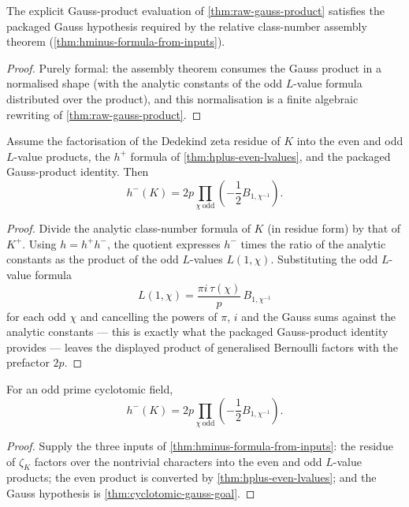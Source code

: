 \begin{theorem}\label{thm:cyclotomic-gauss-goal}
  \leanok
The explicit Gauss-product evaluation of \cref{thm:raw-gauss-product}
satisfies the packaged Gauss hypothesis required by the relative
class-number assembly theorem (\cref{thm:hminus-formula-from-inputs}).
\end{theorem}
\begin{proof}\leanok
Purely formal: the assembly theorem consumes the Gauss product in a
normalised shape (with the analytic constants of the odd $L$-value formula
distributed over the product), and this normalisation is a finite algebraic
rewriting of \cref{thm:raw-gauss-product}.
\end{proof}

\begin{theorem}\label{thm:hminus-formula-from-inputs}
  \leanok
Assume the factorisation of the Dedekind zeta residue of $K$ into the even
and odd $L$-value products, the $h^+$ formula of
\cref{thm:hplus-even-lvalues}, and the packaged Gauss-product identity.
Then
\[
  h^-(K)
  =
  2p\prod_{\chi\ \mathrm{odd}}
    \left(-\frac12 B_{1,\chi^{-1}}\right).
\]
\end{theorem}
\begin{proof}\leanok
Divide the analytic class-number formula of $K$ (in residue form) by that
of $K^+$.  Using $h = h^+ h^-$, the quotient expresses $h^-$ times the
ratio of the analytic constants as the product of the odd $L$-values
$L(1,\chi)$.  Substituting the odd $L$-value formula
\[
  L(1,\chi) = \frac{\pi i\,\tau(\chi)}{p}\,B_{1,\chi^{-1}}
\]
for each odd $\chi$ and cancelling the powers of $\pi$, $i$ and the Gauss
sums against the analytic constants --- this is exactly what the packaged
Gauss-product identity provides --- leaves the displayed product of
generalised Bernoulli factors with the prefactor $2p$.
\end{proof}

\begin{theorem}\label{thm:hminus-formula}
  \leanok
For an odd prime cyclotomic field,
\[
  h^-(K)
  =
  2p\prod_{\chi\ \mathrm{odd}}
    \left(-\frac12 B_{1,\chi^{-1}}\right).
\]
\end{theorem}
\begin{proof}\leanok
Supply the three inputs of \cref{thm:hminus-formula-from-inputs}: the
residue of $\zeta_K$ factors over the nontrivial characters into the even
and odd $L$-value products; the even product is converted by
\cref{thm:hplus-even-lvalues}; and the Gauss hypothesis is
\cref{thm:cyclotomic-gauss-goal}.
\end{proof}

